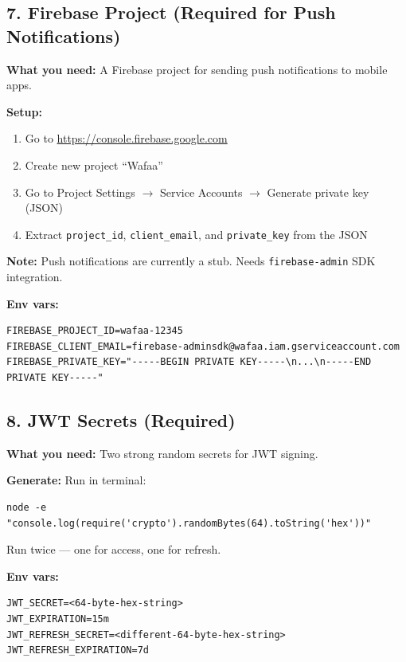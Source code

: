 \documentclass[a4paper,11pt]{article}
\begin{document}
\subsection{7. Firebase Project (Required for Push Notifications)}

\begin{clientbox}
\textbf{What you need:} A Firebase project for sending push notifications to mobile apps.

\textbf{Setup:}
\begin{enumerate}[leftmargin=1.5em]
    \item Go to \url{https://console.firebase.google.com}
    \item Create new project ``Wafaa''
    \item Go to Project Settings $\to$ Service Accounts $\to$ Generate private key (JSON)
    \item Extract \texttt{project\_id}, \texttt{client\_email}, and \texttt{private\_key} from the JSON
\end{enumerate}

\textbf{Note:} Push notifications are currently a stub. Needs \texttt{firebase-admin} SDK integration.

\textbf{Env vars:}
\begin{lstlisting}
FIREBASE_PROJECT_ID=wafaa-12345
FIREBASE_CLIENT_EMAIL=firebase-adminsdk@wafaa.iam.gserviceaccount.com
FIREBASE_PRIVATE_KEY="-----BEGIN PRIVATE KEY-----\n...\n-----END PRIVATE KEY-----"
\end{lstlisting}
\end{clientbox}

\subsection{8. JWT Secrets (Required)}

\begin{clientbox}
\textbf{What you need:} Two strong random secrets for JWT signing.

\textbf{Generate:} Run in terminal:
\begin{lstlisting}
node -e "console.log(require('crypto').randomBytes(64).toString('hex'))"
\end{lstlisting}

Run twice --- one for access, one for refresh.

\textbf{Env vars:}
\begin{lstlisting}
JWT_SECRET=<64-byte-hex-string>
JWT_EXPIRATION=15m
JWT_REFRESH_SECRET=<different-64-byte-hex-string>
JWT_REFRESH_EXPIRATION=7d
\end{lstlisting}
\end{clientbox}
\end{document}
